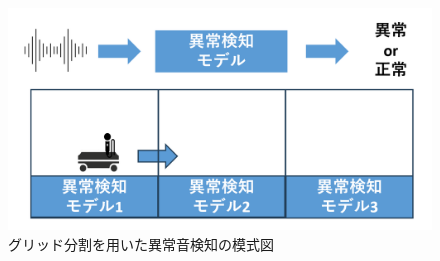 \documentclass[../main]{subfiles}
\begin{document}
\begin{figure}[t]
  \centering
  \includegraphics[keepaspectratio, width=1.0\linewidth]{chap2/fujita_previous_research.png}
  \caption{グリッド分割を用いた異常音検知の模式図}
  \label{fig:fujita_previous_research}
\end{figure}
\end{document}
